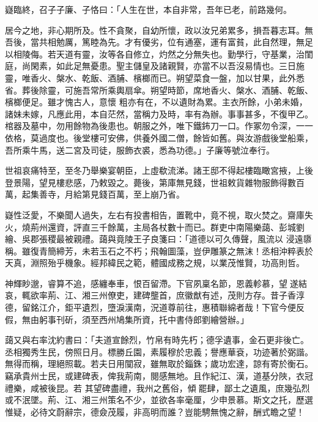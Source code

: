 \begin{pinyinscope}
 嶷臨終，召子子廉、子恪曰：「人生在世，本自非常，吾年已老，前路幾何。



 居今之地，非心期所及。性不貪聚，自幼所懷，政以汝兄弟累多，損吾暮志耳。無吾後，當共相勉厲，篤睦為先。才有優劣，位有通塞，運有富貧，此自然理，無足以相陵侮。若天道有靈，汝等各自修立，灼然之分無失也。勤學行，守基業，治閨庭，尚閑素，如此足無憂患。聖主儲皇及諸親賢，亦當不以吾沒易情也。三日施靈，唯香火、槃水、乾飯、酒脯、檳榔而已。朔望菜食一盤，加以甘果，此外悉省。葬後除靈，可施吾常所乘輿扇傘。朔望時節，席地香火、槃水、酒脯、乾飯、檳榔便足。雖才愧古人，意懷
 粗亦有在，不以遺財為累。主衣所餘，小弟未婚，諸妹未嫁，凡應此用，本自茫然，當稱力及時，率有為辦。事事甚多，不復甲乙。棺器及墓中，勿用餘物為後患也。朝服之外，唯下鐵鈽刀一口。作冢勿令深，一一依格，莫過度也。後堂樓可安佛，供養外國二僧，餘皆如舊。與汝游戲後堂船乘，吾所乘牛馬，送二宮及司徒，服飾衣裘，悉為功德。」子廉等號泣奉行。



 世祖哀痛特至，至冬乃舉樂宴朝臣，上虛欷流涕。諸王邸不得起樓臨瞰宮掖，上後登景陽，望見樓悲感，乃敕毀之。薨後，第庫無見錢，世祖敕貨雜物服飾得數百萬，起集善寺，月給第見錢百萬，至上崩乃省。



 嶷性泛愛，不樂聞人過失，左右有投書相告，置靴中，竟不視，取火焚之。齋庫失火，燒荊州還資，評直三千餘萬，主局各杖數十而已。群吏中南陽樂藹、彭城劉繪、吳郡張稷最被親禮。藹與竟陵王子良箋曰：「道德以可久傳聲，風流以
 浸遠隳稱。雖復青簡締芳，未若玉石之不朽；飛翰圖藻，豈伊雕篆之無沫！丞相沖粹表於天真，淵照殆乎機象。經邦緯民之範，體國成務之規，以業茂惟賢，功高則哲。



 神輝眇邈，睿算不追，感纏奉車，恨百留滯。下官夙稟名節，恩義軫慕，望遂結哀，輒欲率荊、江、湘三州僚吏，建碑壟首，庶徽猷有述，茂則方存。昔子香淳德，留銘江介，鉅平遺烈，墮淚漢南，況道尊前往，惠積聯綿者哉！下官今便反假，無由躬事刊斫，須至西州鳩集所資，托中書侍郎劉繪營辦。」



 藹又與右率沈約書曰：「夫道宣餘烈，竹帛有時先朽；德孚遺事，金石更非後亡。丞相獨秀生民，傍照日月。標勝丘園，素履穆於忠義；譽應華袞，功迹著於弼諧。無得而稱，理絕照載。若夫日用闃寂，雖無取於錙銖；歲功宏達，諒有寄於衡石。竊承貴州士民，或建碑表，俾我荊南，閱感無地。且作紀江、漢，道基分陜，衣冠禮樂，咸被後昆。若
 其望碑盡禮，我州之舊俗，傾罷肆，鄙土之遺風，庶幾弘烈或不泯墜。荊、江、湘三州策名不少，並欲各率毫厘，少申景慕。斯文之托，歷選惟疑，必待文蔚辭宗，德僉茂履，非高明而誰？豈能騁無愧之辭，酬式瞻之望！




\end{pinyinscope}
